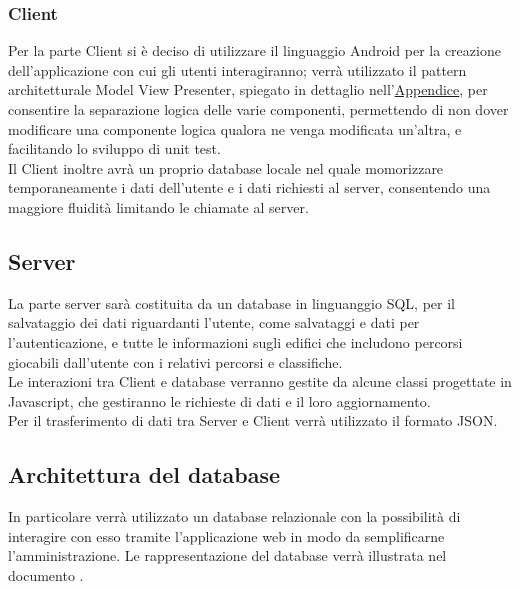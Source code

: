 	\subsubsection{Client}
	Per la parte Client si è deciso di utilizzare il linguaggio Android per la creazione dell'applicazione con cui gli utenti interagiranno;
	verrà utilizzato il pattern architetturale Model View Presenter, spiegato in dettaglio nell'\hyperref[pattern]{Appendice}, per consentire la separazione logica delle varie componenti, permettendo di non dover modificare una componente logica qualora ne venga modificata un'altra, e facilitando lo sviluppo di unit test.\\
	Il Client inoltre avrà un proprio database locale nel quale momorizzare temporaneamente i dati dell'utente e i dati richiesti al server, consentendo una maggiore fluidità limitando le chiamate al server.
	\subsection{Server}
	La parte server sarà costituita da un database in linguanggio SQL, per il salvataggio dei dati riguardanti l'utente, come salvataggi e dati per l'autenticazione, e tutte le informazioni sugli edifici che includono percorsi giocabili dall'utente con i relativi percorsi e classifiche. \\
	Le interazioni tra Client e database verranno gestite da alcune classi progettate in Javascript, che gestiranno le richieste di dati e il loro aggiornamento.\\
	Per il trasferimento di dati tra Server e Client verrà utilizzato il formato JSON.
	\subsection{Architettura del database}
	\label{architetturaDelDatabase}
	In particolare verrà utilizzato un database relazionale  con la possibilità di interagire con esso tramite l'applicazione web  in modo da semplificarne l'amministrazione.
	Le rappresentazione del database verrà illustrata nel documento \DPdoc.
		
